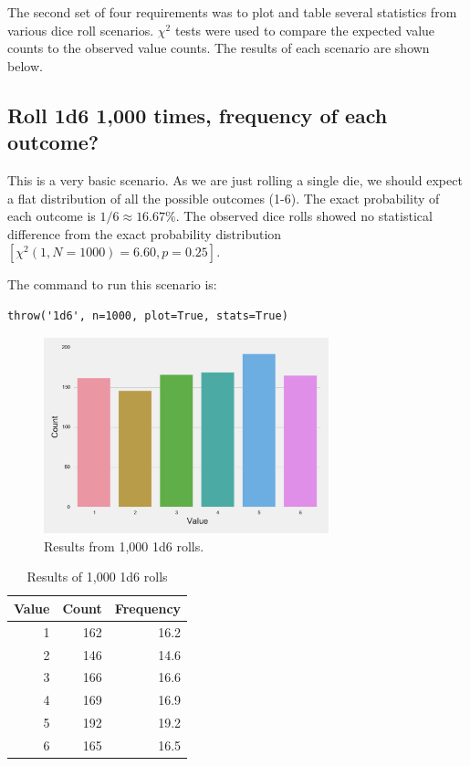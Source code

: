 \documentclass[twocolumn,letterpaper]{article}  %
\begin{document}
The second set of four requirements was to plot and table several statistics from various dice roll scenarios. $\chi^2$ tests were used to compare the expected value counts to the observed value counts. The results of each scenario are shown below.

\subsection{Roll 1d6 1,000 times, frequency of each outcome?}
This is a very basic scenario. As we are just rolling a single die, we should expect a flat distribution of all the possible outcomes (1-6). The exact probability of each outcome is $1/6 \approx 16.67\%$. The observed dice rolls showed no statistical difference from the exact probability distribution $[\chi^2 (1,N=1000)=6.60, p=0.25]$.

The command to run this scenario is:
\begin{lstlisting}
throw('1d6', n=1000, plot=True, stats=True)
\end{lstlisting}
\begin{figure}[h!]
\centering
\includegraphics[width=3.25in]{1d6.pdf}
\caption{Results from 1,000 1d6 rolls.}
\end{figure}

\begin{table}[h!]
\begin{center}
\begin{tabular}{*{3}{r}}
\toprule
Value & Count & Frequency \\
\midrule
     1 &   162 &      16.2 \\
     2 &   146 &      14.6 \\
     3 &   166 &      16.6 \\
     4 &   169 &      16.9 \\
     5 &   192 &      19.2 \\
     6 &   165 &      16.5 \\
\bottomrule
\end{tabular}
\end{center}
\caption{Results of 1,000 1d6 rolls}
\end{table}
\end{document}
